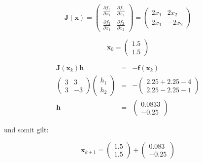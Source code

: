 \documentclass[german, 10pt, a4paper, twocolumn]{scrartcl}
\begin{document}
\begin{displaymath}
	\mathbf{J}(\mathbf{x})=\left (
		\begin{array}{cc}
			\frac{\partial f_1}{\partial x_1} &	\frac{\partial f_1}{\partial x_2} \\
			\frac{\partial f_2}{\partial x_1} &	\frac{\partial f_2}{\partial x_2}
		\end{array}
		\right ) =
		\left (
		\begin{array}{cc}
			2x_1 &	2x_2 \\
			2x_1 &	-2x_2
		\end{array}
		\right )
\end{displaymath}

\begin{displaymath}
	\mathbf{x}_0 = \left (
		\begin{array}{c}
			1.5\\
			1.5
		\end{array}
		\right )
\end{displaymath}

\begin{eqnarray}
	\mathbf{J}(\mathbf{x}_k) \mathbf{h} &	= &	-\mathbf{f}(\mathbf{x}_k) \nonumber \\
	\left (
	\begin{array}{cc}
		3 &	3 \\
		3 &	-3
	\end{array}
	\right )
	\left (
	\begin{array}{c}
		h_1\\
		h_2
	\end{array}
	\right ) &
	= &
	-\left (
	\begin{array}{c}
		2.25 + 2.25 -4\\
		2.25 - 2.25 -1
	\end{array}
	\right )\nonumber \\
	\mathbf{h} &	= & \left (
	\begin{array}{c}
		0.0833\\
		-0.25
	\end{array}
	\right )\nonumber
\end{eqnarray}

und somit gilt:

\begin{displaymath}
	\mathbf{x}_{k+1} = \left (
	\begin{array}{c}
		1.5 \\
		1.5
	\end{array}
	\right )
	+
	\left (
	\begin{array}{c}
		0.083\\
		-0.25
	\end{array}
	\right )
\end{displaymath}
\end{document}
